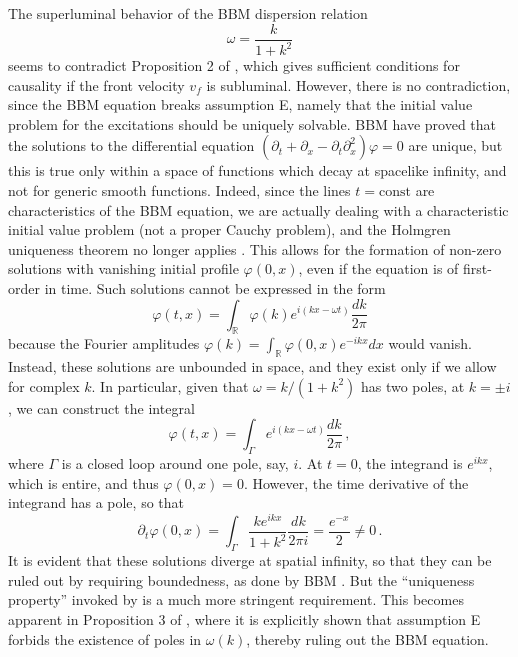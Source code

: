 \documentclass[prl, amsfonts, amssymb, amsmath, nofootinbib,reprint, showkeys, twoside,notitlepage]{revtex4-2}
\theoremstyle{definition}
\theoremstyle{theorem}
\theoremstyle{corollary}
\begin{document}
The superluminal behavior of the BBM dispersion relation
\begin{equation}
\omega= \dfrac{k}{1+k^2} 
\end{equation}
seems to contradict Proposition 2 of \cite{Krotscheck1978}, which gives sufficient conditions for causality if the front velocity $v_f$ is subluminal. However, there is no contradiction, since the BBM equation breaks assumption E, namely that the initial value problem for the excitations should be uniquely solvable. BBM \cite{Benjamin1972} have proved that the solutions to the differential equation $(\partial_t + \partial_x - \partial_t \partial^2_x)\varphi=0$ are unique, but this is true only within a space of functions which decay at spacelike infinity, and not for generic smooth functions. Indeed, since the lines $t=\text{const}$ are characteristics of the BBM equation, we are actually dealing with a characteristic initial value problem (not a proper Cauchy problem), and the Holmgren uniqueness theorem no longer applies \cite{Rauch_book}. This allows for the formation of non-zero solutions with vanishing initial profile $\varphi(0,x)$, even if the equation is of first-order in time. Such solutions cannot be expressed in the form
\begin{equation}
\varphi(t,x)= \int_{\mathbb{R}}\varphi(k)e^{i(kx-\omega t)}\dfrac{dk}{2\pi}
\end{equation}
because the Fourier amplitudes $\varphi(k)=\int_{\mathbb{R}} \varphi(0,x)e^{-ikx}dx$ would vanish. Instead, these solutions are unbounded in space, and they exist only if we allow for complex $k$. In particular, given that $\omega=k/(1+k^2)$ has two poles, at $k=\pm i$, we can construct the integral
\begin{equation}\label{fourz}
\varphi(t,x)= \int_\Gamma e^{i(kx-\omega t)} \dfrac{dk}{2\pi} \, ,
\end{equation}
where $\Gamma$ is a closed loop around one pole, say, $i$. At $t=0$, the integrand is $e^{ikx}$, which is entire, and thus $\varphi(0,x)=0$. However, the time derivative of the integrand has a pole, so that
\begin{equation}\label{ferguz}
\partial_t \varphi(0,x) =  \int_\Gamma  \dfrac{k e^{ikx}}{1+k^2} \dfrac{dk}{2\pi i} = \dfrac{e^{-x}}{2} \neq 0 \, .
\end{equation} 
It is evident that these solutions diverge at spatial infinity, so that they can be ruled out by requiring boundedness, as done by BBM \cite{Benjamin1972}. But the ``uniqueness property'' invoked by \citet{Krotscheck1978} is a much more stringent requirement. This becomes apparent in Proposition 3 of \cite{Krotscheck1978}, where it is explicitly shown that assumption E forbids the existence of poles in $\omega(k)$, thereby ruling out the BBM equation. 
\end{document}
